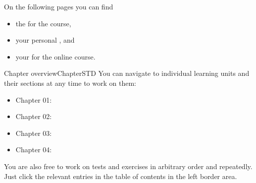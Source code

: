 \ifttm
\MSetSubject{\MINTPhysics}

\begin{MSectionStart}
On the following pages you can find
\begin{itemize}
\item{the  for the course,}
\item{your personal ,} and
\item{your  for the online course.}
\end{itemize}
\end{MSectionStart}


\begin{MXContent}{Chapter overview}{Chapter}{STD}
\MGlobalChapterTag
You can navigate to individual learning units and their sections at any time to work on them:
\begin{itemize}
\item{Chapter 01: }
\item{Chapter 02: }
\item{Chapter 03: }
\item{Chapter 04: }
\end{itemize}
You are also free to work on tests and exercises in arbitrary order and repeatedly.
Just click the relevant entries in the table of contents in the left border area.
\end{MXContent}


